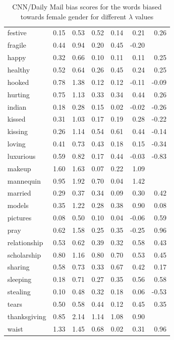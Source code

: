 \documentclass[11pt,a4paper]{article}
\begin{document}
\begin{table}[t]
\begin{tabular}{|l|r|r|r|r|r|r|}
festive       & 0.15 & 0.53 & 0.52 & 0.14 & 0.21  & 0.26  \\
fragile       & 0.44 & 0.94 & 0.20 & 0.45 & -0.20 &       \\
happy         & 0.32 & 0.66 & 0.10 & 0.11 & 0.11  & 0.25  \\
healthy       & 0.52 & 0.64 & 0.26 & 0.45 & 0.24  & 0.25  \\
hooked        & 0.78 & 1.38 & 0.12 & 0.12 & -0.11 & -0.09 \\
hurting       & 0.75 & 1.13 & 0.33 & 0.34 & 0.44  & 0.26  \\
indian        & 0.18 & 0.28 & 0.15 & 0.02 & -0.02 & -0.26 \\
kissed        & 0.31 & 1.03 & 0.17 & 0.19 & 0.28  & -0.22 \\
kissing       & 0.26 & 1.14 & 0.54 & 0.61 & 0.44  & -0.14 \\
loving        & 0.41 & 0.73 & 0.43 & 0.18 & 0.15  & -0.34 \\
luxurious     & 0.59 & 0.82 & 0.17 & 0.44 & -0.03 & -0.83 \\
makeup        & 1.60 & 1.63 & 0.07 & 0.22 & 1.09  &       \\
mannequin     & 0.95 & 1.92 & 0.70 & 0.04 & 1.42  &       \\
married       & 0.29 & 0.37 & 0.34 & 0.09 & 0.30  & 0.42  \\
models        & 0.35 & 1.22 & 0.28 & 0.38 & 0.90  & 0.08  \\
pictures      & 0.08 & 0.50 & 0.10 & 0.04 & -0.06 & 0.59  \\
pray          & 0.62 & 1.58 & 0.25 & 0.35 & -0.25 & 0.96  \\
relationship  & 0.53 & 0.62 & 0.39 & 0.32 & 0.58  & 0.43  \\
scholarship   & 0.80 & 1.16 & 0.80 & 0.70 & 0.53  & 0.45  \\
sharing       & 0.58 & 0.73 & 0.33 & 0.67 & 0.42  & 0.17  \\
sleeping      & 0.18 & 0.71 & 0.27 & 0.35 & 0.56  & 0.58  \\
stealing      & 0.10 & 0.48 & 0.32 & 0.18 & 0.06  & -0.53 \\
tears         & 0.50 & 0.58 & 0.44 & 0.12 & 0.45  & 0.35  \\
thanksgiving  & 0.85 & 2.14 & 1.14 & 1.08 & 0.90  &       \\
waist         & 1.33 & 1.45 & 0.68 & 0.02 & 0.31  & 0.96 \\
 \bottomrule
    \end{tabular}
    \caption{ CNN/Daily Mail bias scores for the words biased towards female gender for  different $\lambda$  values}
    \label{tab:dmf}
\end{table}
\end{document}
